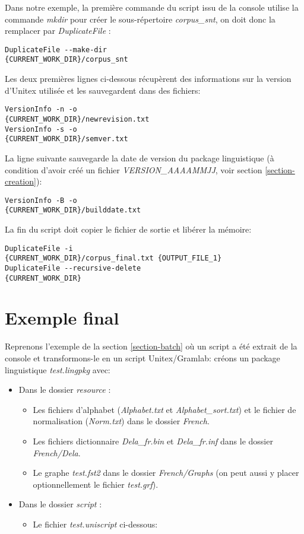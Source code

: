 \bigskip
\noindent Dans notre exemple, la première commande du script issu de la console utilise la commande \emph{mkdir} pour créer le sous-répertoire \emph{corpus\_snt}, on doit donc la remplacer par \emph{DuplicateFile} :

\begin{verbatim}
DuplicateFile --make-dir 
{CURRENT_WORK_DIR}/corpus_snt
\end{verbatim}

\bigskip
\noindent Les deux premières lignes ci-dessous récupèrent des informations sur la version d'Unitex utilisée et les sauvegardent dans des fichiers:

\begin{verbatim}
VersionInfo -n -o 
{CURRENT_WORK_DIR}/newrevision.txt
VersionInfo -s -o 
{CURRENT_WORK_DIR}/semver.txt
\end{verbatim}

\bigskip
\noindent La ligne suivante sauvegarde la date de version du package linguistique (à condition d'avoir créé un fichier \emph{VERSION\_AAAAMMJJ}, voir section \ref{section-creation}):

\begin{verbatim}
VersionInfo -B -o 
{CURRENT_WORK_DIR}/builddate.txt
\end{verbatim}

\bigskip
\noindent La fin du script doit copier le fichier de sortie et libérer la mémoire:

\begin{verbatim}
DuplicateFile -i 
{CURRENT_WORK_DIR}/corpus_final.txt {OUTPUT_FILE_1}
DuplicateFile --recursive-delete 
{CURRENT_WORK_DIR}
\end{verbatim}

\section{Exemple final}

Reprenons l'exemple de la section \ref{section-batch} où un script a été extrait de la console et transformons-le en un script Unitex/Gramlab: créons un package linguistique \emph{test.lingpkg} avec:
\begin{itemize}
\item Dans le dossier \emph{resource} :
\begin{itemize}
\item Les fichiers d'alphabet (\emph{Alphabet.txt} et \emph{Alphabet\_sort.txt}) et le fichier de normalisation (\emph{Norm.txt}) dans le dossier \emph{French}.
\item Les fichiers dictionnaire \emph{Dela\_fr.bin} et \emph{Dela\_fr.inf} dans le dossier \emph{French/Dela}.
\item Le graphe \emph{test.fst2} dans le dossier \emph{French/Graphs} (on peut aussi y placer optionnellement le fichier \emph{test.grf}).
\end{itemize}
\item Dans le dossier \emph{script} :
\begin{itemize}
\item Le fichier \emph{test.uniscript} ci-dessous:
\end{itemize}
\end{itemize}

